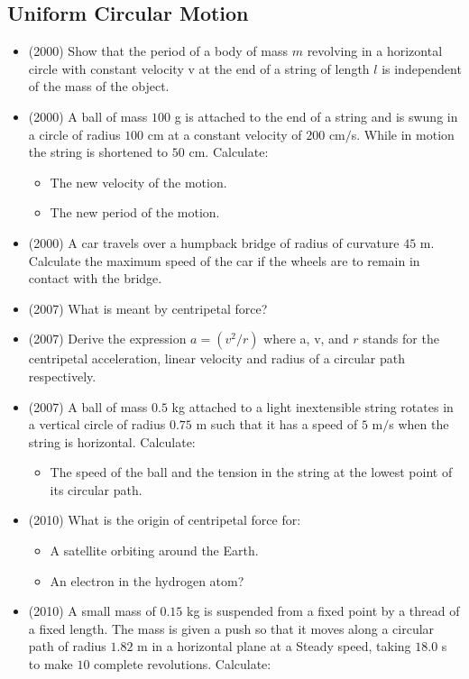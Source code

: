 \documentclass{article}
\begin{document}
\subsection{Uniform Circular Motion}
\begin{itemize}
\item (2000)  Show that the period of a body of mass $ m$ revolving in a horizontal circle with constant velocity v at the end of a string of length $ l$ is independent of the mass of the object.
\item (2000)  A ball of mass $ 100$ g is attached to the end of a string and is swung in a circle of radius $ 100$ cm at a constant velocity of $ 200$ cm$/$s. While in motion the string is shortened to $ 50$ cm. Calculate:
 \begin{itemize}
\item The new velocity of the motion.
\item The new period of the motion.
\end{itemize}
\item (2000)  A car travels over a humpback bridge of radius of curvature $ 45$ m. Calculate the maximum speed of the car if the wheels are to remain in contact with the bridge.
\item (2007)  What is meant by centripetal force?
\item (2007)  Derive the expression $ a =(v^{2}/r)$ where a, v, and $ r$ stands for the centripetal acceleration, linear velocity and radius of a circular path respectively.  
\item (2007)  A ball of mass $ 0.5$ kg attached to a light inextensible string rotates in a vertical circle of radius $ 0.75$ m such that it has a speed of $ 5$ m$/$s when the string is horizontal.  Calculate:
 \begin{itemize}
\item  The speed of the ball and the tension in the string at the lowest point of its circular path.
\end{itemize}
\item (2010)  What is the origin of centripetal force for:
 \begin{itemize}
\item A satellite orbiting around the Earth. 
\item An electron in the hydrogen atom?
\end{itemize}
\item (2010)  A small mass of $ 0.15$ kg is suspended from a fixed point by a thread of a fixed length. The mass is given a push so that it moves along a circular path of radius $ 1.82$ m in a horizontal plane at a Steady speed, taking $ 18.0$ s to make $ 10$ complete revolutions. Calculate:

\end{itemize}
\end{document}
